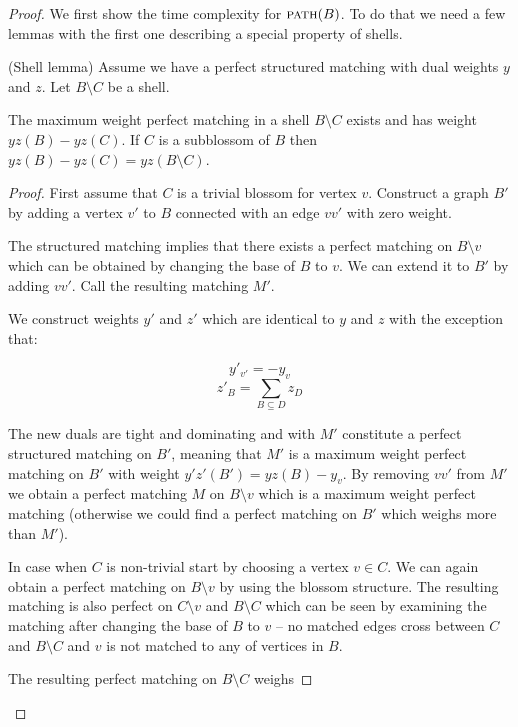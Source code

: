 \begin{proof}

    We first show the time complexity for $\textsc{path}(B)$. To do that we need a few lemmas with the first one describing a special property of shells.

\begin{lemma}{(Shell lemma)}\label{lem:shell}
    Assume we have a perfect structured matching with dual weights $y$ and $z$. Let $B \setminus C$ be a shell.

    The maximum weight perfect matching in a shell $B \setminus C$ exists and has weight $yz(B) - yz(C)$. If $C$ is a subblossom of $B$ then $yz(B) - yz(C) = yz(B \setminus C)$. 
\end{lemma}

\begin{proof}
    First assume that $C$ is a trivial blossom for vertex $v$. Construct a graph $B'$ by adding a vertex $v'$ to $B$ connected with an edge $vv'$ with zero weight. 
    
    The structured matching implies that there exists a perfect matching on $B \setminus v$ which can be obtained by changing the base of $B$ to $v$. We can extend it to $B'$ by adding $vv'$. Call the resulting matching $M'$.

    We construct weights $y'$ and $z'$ which are identical to $y$ and $z$ with the exception that:

    \[y'_{v'} = -y_v \]
    \[z'_B = \sum_{B \subseteq D} z_D \]

    The new duals are tight and dominating and with $M'$ constitute a perfect structured matching on $B'$, meaning that $M'$ is a maximum weight perfect matching on $B'$ with weight $y'z'(B') = yz(B) - y_v$. By removing $vv'$ from $M'$ we obtain a perfect matching $M$ on $B \setminus v$ which is a maximum weight perfect matching (otherwise we could find a perfect matching on $B'$ which weighs more than $M'$).

    In case when $C$ is non-trivial start by choosing a vertex $v \in C$. We can again obtain a perfect matching on $B \setminus v$ by using the blossom structure. The resulting matching is also perfect on $C \setminus v$ and $B \setminus C$ which can be seen by examining the matching after changing the base of $B$ to $v$ – no matched edges cross between $C$ and $B \setminus C$ and $v$ is not matched to any of vertices in $B$.

    The resulting perfect matching on $B \setminus C$ weighs


\end{proof}
\end{proof}
